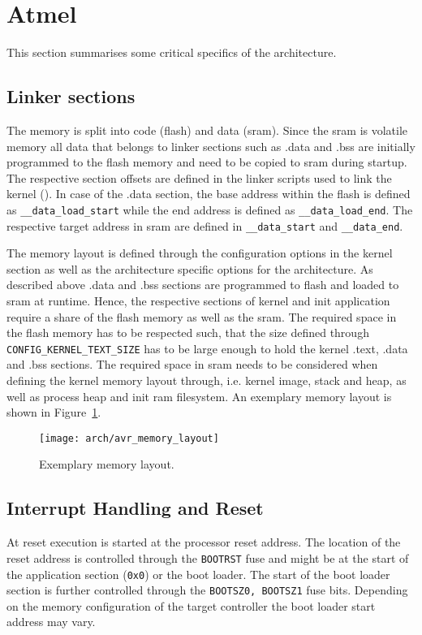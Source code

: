 \section{Atmel \avr}
	This section summarises some critical specifics of the \avr architecture.

	\subsection{Linker sections}
		The \avr memory is split into code (flash) and data (\gls{sram}). Since the \gls{sram} is volatile memory all data that belongs to linker sections such as .data and .bss are initially programmed to the flash memory and need to be copied to \gls{sram} during startup. The respective section offsets are defined in the linker scripts used to link the kernel (). In case of the .data section, the base address within the flash is defined as \lstinline{__data_load_start} while the end address is defined as \lstinline{__data_load_end}. The respective target address in \gls{sram} are defined in \lstinline{__data_start} and \lstinline{__data_end}.

		The memory layout is defined through the configuration options in the kernel section as well as the architecture specific options for the \avr architecture. As described above .data and .bss sections are programmed to flash and loaded to \gls{sram} at runtime. Hence, the respective sections of kernel and init application require a share of the flash memory as well as the \gls{sram}. The required space in the flash memory has to be respected such, that the size defined through \lstinline{CONFIG_KERNEL_TEXT_SIZE} has to be large enough to hold the kernel .text, .data and .bss sections. The required space in \gls{sram} needs to be considered when defining the kernel memory layout through, i.e. kernel image, stack and heap, as well as process heap and init ram filesystem. An exemplary memory layout is shown in Figure~\ref{fig:avr_memory_layout}.
		\begin{figure}[h]
			\centering	
			\texttt{[image: arch/avr\_memory\_layout]}
			\caption{Exemplary \avr memory layout.}
			\label{fig:avr_memory_layout}
		\end{figure}

	\subsection{Interrupt Handling and Reset}
		At reset execution is started at the processor reset address. The location of the reset address is controlled through the \lstinline{BOOTRST} fuse and might be at the start of the application section (\lstinline{0x0}) or the boot loader. The start of the boot loader section is further controlled through the \lstinline{BOOTSZ0, BOOTSZ1} fuse bits. Depending on the memory configuration of the target controller the boot loader start address may vary.
		
